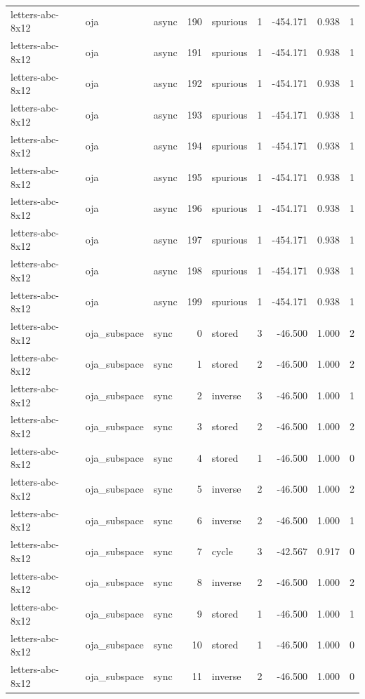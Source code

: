 \begin{tabular}{lllrlrrrr}
letters-abc-8x12 & oja & async & 190 & spurious & 1 & -454.171 & 0.938 & 1 \\
letters-abc-8x12 & oja & async & 191 & spurious & 1 & -454.171 & 0.938 & 1 \\
letters-abc-8x12 & oja & async & 192 & spurious & 1 & -454.171 & 0.938 & 1 \\
letters-abc-8x12 & oja & async & 193 & spurious & 1 & -454.171 & 0.938 & 1 \\
letters-abc-8x12 & oja & async & 194 & spurious & 1 & -454.171 & 0.938 & 1 \\
letters-abc-8x12 & oja & async & 195 & spurious & 1 & -454.171 & 0.938 & 1 \\
letters-abc-8x12 & oja & async & 196 & spurious & 1 & -454.171 & 0.938 & 1 \\
letters-abc-8x12 & oja & async & 197 & spurious & 1 & -454.171 & 0.938 & 1 \\
letters-abc-8x12 & oja & async & 198 & spurious & 1 & -454.171 & 0.938 & 1 \\
letters-abc-8x12 & oja & async & 199 & spurious & 1 & -454.171 & 0.938 & 1 \\
letters-abc-8x12 & oja\_subspace & sync & 0 & stored & 3 & -46.500 & 1.000 & 2 \\
letters-abc-8x12 & oja\_subspace & sync & 1 & stored & 2 & -46.500 & 1.000 & 2 \\
letters-abc-8x12 & oja\_subspace & sync & 2 & inverse & 3 & -46.500 & 1.000 & 1 \\
letters-abc-8x12 & oja\_subspace & sync & 3 & stored & 2 & -46.500 & 1.000 & 2 \\
letters-abc-8x12 & oja\_subspace & sync & 4 & stored & 1 & -46.500 & 1.000 & 0 \\
letters-abc-8x12 & oja\_subspace & sync & 5 & inverse & 2 & -46.500 & 1.000 & 2 \\
letters-abc-8x12 & oja\_subspace & sync & 6 & inverse & 2 & -46.500 & 1.000 & 1 \\
letters-abc-8x12 & oja\_subspace & sync & 7 & cycle & 3 & -42.567 & 0.917 & 0 \\
letters-abc-8x12 & oja\_subspace & sync & 8 & inverse & 2 & -46.500 & 1.000 & 2 \\
letters-abc-8x12 & oja\_subspace & sync & 9 & stored & 1 & -46.500 & 1.000 & 1 \\
letters-abc-8x12 & oja\_subspace & sync & 10 & stored & 1 & -46.500 & 1.000 & 0 \\
letters-abc-8x12 & oja\_subspace & sync & 11 & inverse & 2 & -46.500 & 1.000 & 0 \\

\end{tabular}

